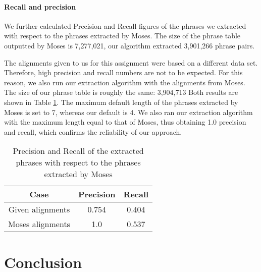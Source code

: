 \documentclass[11pt]{article}
\begin{document}
\paragraph{Recall and precision}
We further calculated Precision and Recall figures of the phrases we extracted with respect to the phrases extracted by Moses. 
The size of the phrase table outputted by Moses is 7,277,021, our algorithm extracted 3,901,266 phrase pairs. 

The alignments given to us for this assignment were based on a different data set. Therefore, high precision and recall numbers are not to be expected. For this reason, we also run our extraction algorithm with the alignments from Moses. 
The size of our phrase table is roughly the same: 3,904,713
Both results are shown in Table \ref{PR}.
The maximum default length of the phrases extracted by Moses is set to 7, whereas our default is 4. 
We also ran our extraction algorithm with the maximum length equal to that of Moses, thus obtaining 1.0 precision and recall, which confirms the reliability of our approach.

\begin{table}[h]
\centering
\begin{tabular}{ c c c}
  \hline \hline
  \textbf{Case} & \textbf{Precision} & \textbf{Recall} \\
  \hline \hline
  Given alignments &  0.754 & 0.404\\
  Moses alignments& 1.0 & 0.537 \\
  \hline
\end{tabular}
\caption{Precision and Recall of the extracted phrases with respect to the phrases extracted by Moses}
\label{PR}
\end{table}



\section{Conclusion}
\label{Concl}
\end{document}
